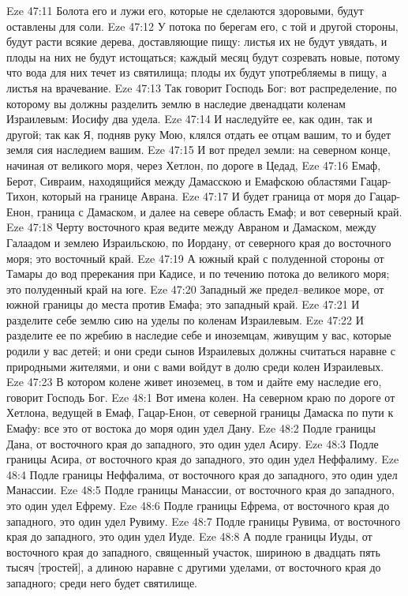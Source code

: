 Eze 47:11  Болота его и лужи его, которые не сделаются здоровыми, будут оставлены для соли.
Eze 47:12  У потока по берегам его, с той и другой стороны, будут расти всякие дерева, доставляющие пищу: листья их не будут увядать, и плоды на них не будут истощаться; каждый месяц будут созревать новые, потому что вода для них течет из святилища; плоды их будут употребляемы в пищу, а листья на врачевание.
Eze 47:13  Так говорит Господь Бог: вот распределение, по которому вы должны разделить землю в наследие двенадцати коленам Израилевым: Иосифу два удела.
Eze 47:14  И наследуйте ее, как один, так и другой; так как Я, подняв руку Мою, клялся отдать ее отцам вашим, то и будет земля сия наследием вашим.
Eze 47:15  И вот предел земли: на северном конце, начиная от великого моря, через Хетлон, по дороге в Цедад,
Eze 47:16  Емаф, Берот, Сивраим, находящийся между Дамасскою и Емафскою областями Гацар-Тихон, который на границе Аврана.
Eze 47:17  И будет граница от моря до Гацар-Енон, граница с Дамаском, и далее на севере область Емаф; и вот северный край.
Eze 47:18  Черту восточного края ведите между Авраном и Дамаском, между Галаадом и землею Израильскою, по Иордану, от северного края до восточного моря; это восточный край.
Eze 47:19  А южный край с полуденной стороны от Тамары до вод пререкания при Кадисе, и по течению потока до великого моря; это полуденный край на юге.
Eze 47:20  Западный же предел--великое море, от южной границы до места против Емафа; это западный край.
Eze 47:21  И разделите себе землю сию на уделы по коленам Израилевым.
Eze 47:22  И разделите ее по жребию в наследие себе и иноземцам, живущим у вас, которые родили у вас детей; и они среди сынов Израилевых должны считаться наравне с природными жителями, и они с вами войдут в долю среди колен Израилевых.
Eze 47:23  В котором колене живет иноземец, в том и дайте ему наследие его, говорит Господь Бог.
Eze 48:1  Вот имена колен. На северном краю по дороге от Хетлона, ведущей в Емаф, Гацар-Енон, от северной границы Дамаска по пути к Емафу: все это от востока до моря один удел Дану.
Eze 48:2  Подле границы Дана, от восточного края до западного, это один удел Асиру.
Eze 48:3  Подле границы Асира, от восточного края до западного, это один удел Неффалиму.
Eze 48:4  Подле границы Неффалима, от восточного края до западного, это один удел Манассии.
Eze 48:5  Подле границы Манассии, от восточного края до западного, это один удел Ефрему.
Eze 48:6  Подле границы Ефрема, от восточного края до западного, это один удел Рувиму.
Eze 48:7  Подле границы Рувима, от восточного края до западного, это один удел Иуде.
Eze 48:8  А подле границы Иуды, от восточного края до западного, священный участок, шириною в двадцать пять тысяч [тростей], а длиною наравне с другими уделами, от восточного края до западного; среди него будет святилище.
